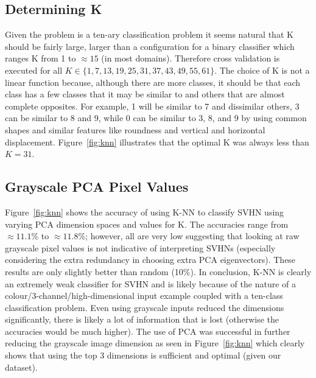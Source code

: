 \documentclass{article} %
\begin{document}
\subsection{Determining K} \label{knn_k}
Given the problem is a ten-ary classification problem it seems natural that K should be fairly large, larger than a configuration for a binary classifier which ranges K from 1 to $\approx 15$ (in most domains).  Therefore cross validation is executed for all $K \in \{1, 7, 13, 19, 25, 31, 37, 43, 49, 55, 61\}$.  The choice of K is not a linear function because, although there are more classes, it should be that each class has a few classes that it may be similar to and others that are almost complete opposites.  For example, 1 will be similar to 7 and dissimilar others, 3 can be similar to 8 and 9, while 0 can be similar to 3, 8, and 9 by using common shapes and similar features like roundness and vertical and horizontal displacement.  Figure~\ref{fig:knn} illustrates that the optimal K was always less than $K=31$.

\subsection{Grayscale PCA Pixel Values}
Figure~\ref{fig:knn} shows the accuracy of using K-NN to classify SVHN using varying PCA dimension spaces and values for K. The accuracies range from $\approx 11.1\%$ to $\approx 11.8\%$; however, all are very low suggesting that looking at raw grayscale pixel values is not indicative of interpreting SVHNs (especially considering the extra redundancy in choosing extra PCA eigenvectors).  These results are only slightly better than random (10\%).  In conclusion, K-NN is clearly an extremely weak classifier for SVHN and is likely because of the nature of a colour/3-channel/high-dimensional input example coupled with a ten-class classification problem.  Even using grayscale inputs reduced the dimensions significantly, there is likely a lot of information that is lost (otherwise the accuracies would be much higher).  The use of PCA was successful in further reducing the grayscale image dimension as seen in Figure~\ref{fig:knn} which clearly shows that using the top 3 dimensions is sufficient and optimal (given our dataset).
\end{document}
